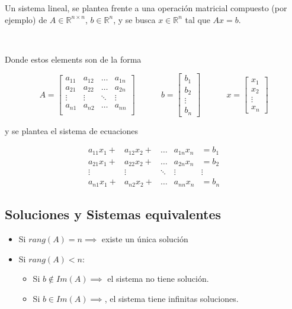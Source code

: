 
Un sistema lineal, se plantea frente a una operación matricial compuesto (por ejemplo) de $A \in \mathbb{R}^{n\times n}$, $b \in \mathbb{R}^{n}$, y se busca $x \in \mathbb{R}^{n}$ tal que $Ax = b$.

\

Donde estos elements son de la forma

\[
A = 
\begin{bmatrix}
a_{11} & a_{12} & \ldots & a_{1n} \\
a_{21} & a_{22} & \ldots & a_{2n} \\
\vdots & \vdots & \ddots & \vdots \\
a_{n1} & a_{n2} & \ldots & a_{nn} \\
\end{bmatrix}
~~~~~~~~~~~~~~
b =
\begin{bmatrix}
b_1 \\
b_2 \\
\vdots \\
b_n 
\end{bmatrix}
~~~~~~~~~~~~~~
x = 
\begin{bmatrix}
x_1 \\
x_2 \\
\vdots \\
x_n
\end{bmatrix}
\]

y se plantea el sistema de ecuaciones

\[
\begin{matrix}
a_{11}x_{1} + & a_{12}x_{2} + & \ldots & a_{1n}x_n & = b_1 \\
a_{21}x_{1} + & a_{22}x_{2} + & \ldots & a_{2n}x_n & = b_2 \\
\vdots & \vdots & \ddots & \vdots & \vdots \\
a_{n1}x_{1} + & a_{n2}x_{2} + & \ldots & a_{nn}x_n & = b_n
\end{matrix}
\]

\subsection{Soluciones y Sistemas equivalentes}\label{subsec:soluciones_y_sistemas_equivalentes}

\begin{itemize}
    \item Si $rang(A) = n \implies$ existe un única solución
    \item Si $rang(A) < n$:
    \begin{itemize}
        \item Si $b \notin Im(A) \implies$ el sistema no tiene solución.
        \item Si $b \in Im(A) \implies$, el sistema tiene infinitas soluciones. 
    \end{itemize}
\end{itemize}

